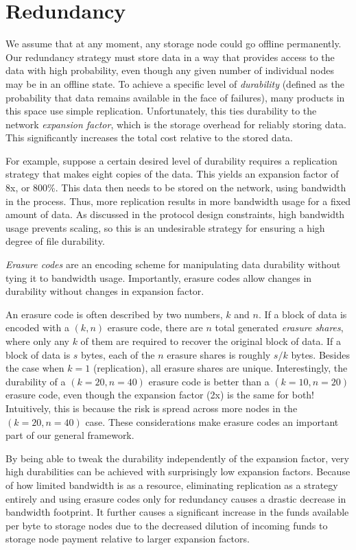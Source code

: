 \documentclass[11pt,fleqn,openany]{book}
\begin{document}
\section{Redundancy}

We assume that at any moment, any storage node could go offline permanently.
Our redundancy
strategy must store data in a way that provides access to the data with high
probability, even though any given number of individual nodes may be in
an offline state. To
achieve a specific level of {\em durability} (defined as the probability that
data remains available in the face of failures), many products in this space use
simple replication. Unfortunately, this ties durability to the network {\em
expansion factor}, which is the storage overhead for reliably storing data. This
significantly increases the total cost relative to the stored data.

For example, suppose a certain desired level of durability requires a
replication strategy that makes eight copies of the data. This yields an
expansion factor of 8x, or 800\%. This data then needs to be stored on the
network, using bandwidth in the process. Thus, more replication results in more
bandwidth usage for a fixed amount of data. As discussed in the protocol design
constraints, high bandwidth usage prevents scaling, so this is an undesirable
strategy for ensuring a high degree of file durability.

{\em Erasure codes} are an encoding scheme for manipulating
data durability without tying it to bandwidth usage. Importantly, erasure
codes allow changes in durability without changes in expansion factor.

An erasure code is often described by two numbers, $k$ and $n$. If a block of
data is encoded with a $(k,n)$ erasure code, there are $n$ total generated {\em
erasure shares}, where only any $k$ of them are required to recover the original
block of data. If a block of data is $s$ bytes, each of the $n$ erasure shares
is roughly $s/k$ bytes. Besides the case when $k=1$ (replication), all erasure
shares are unique. Interestingly, the durability of a $(k=20,n=40)$ erasure code
is better than a $(k=10,n=20)$ erasure code, even though the expansion factor
(2x) is the same for both! Intuitively, this is because the risk is spread
across more nodes in the $(k=20,n=40)$ case. These considerations make erasure
codes an important part of our general framework.

By being able to tweak the durability independently of the expansion factor,
very high durabilities can be achieved with surprisingly low expansion factors.
Because of how limited bandwidth is as a resource, eliminating replication as a
strategy entirely and using erasure codes only for redundancy causes a drastic
decrease in bandwidth footprint.
It further causes a significant increase in the funds available per byte to
storage nodes due to the decreased dilution of incoming funds to storage node
payment relative to larger expansion factors.
\end{document}
